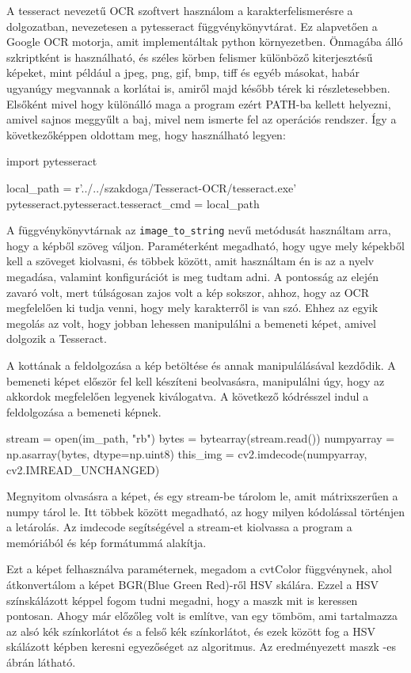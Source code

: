 A tesseract nevezetű OCR szoftvert használom a karakterfelismerésre a dolgozatban, nevezetesen a pytesseract függvénykönyvtárat. Ez alapvetően a Google OCR motorja, amit implementáltak python környezetben. Önmagába álló szkriptként is használható, és széles körben felismer különböző kiterjesztésű képeket, mint például a jpeg, png, gif, bmp, tiff és egyéb másokat, habár ugyanúgy megvannak a korlátai is, amiről majd később térek ki részletesebben. Elsőként mivel hogy különálló maga a program ezért PATH-ba kellett helyezni, amivel sajnos meggyűlt a baj, mivel nem ismerte fel az operációs rendszer. Így a következőképpen oldottam meg, hogy használható legyen:
\begin{python}
import pytesseract

local_path = r'../../szakdoga/Tesseract-OCR/tesseract.exe'
pytesseract.pytesseract.tesseract_cmd = local_path
\end{python}
A függvénykönyvtárnak az \texttt{image\_to\_string} nevű metódusát használtam arra, hogy a képből szöveg váljon. Paraméterként megadható, hogy ugye mely képekből kell a szöveget kiolvasni, és többek között, amit használtam én is az a nyelv megadása, valamint konfigurációt is meg tudtam adni. A pontosság az elején zavaró volt, mert túlságosan zajos volt a kép sokszor, ahhoz, hogy az OCR megfelelően ki tudja venni, hogy mely karakterről is van szó. Ehhez az egyik megolás az volt, hogy jobban lehessen manipulálni a bemeneti képet, amivel dolgozik a Tesseract.


A kottának a feldolgozása a kép betöltése és annak manipulálásával kezdődik. A bemeneti képet először fel kell készíteni beolvasásra, manipulálni úgy, hogy az akkordok megfelelően legyenek kiválogatva. A következő kódrésszel indul a feldolgozása a bemeneti képnek.

\begin{python}
stream = open(im_path, "rb")
bytes = bytearray(stream.read())
numpyarray = np.asarray(bytes, dtype=np.uint8)
this_img = cv2.imdecode(numpyarray, cv2.IMREAD_UNCHANGED)
\end{python}
Megnyitom olvasásra a képet, és egy stream-be tárolom le, amit mátrixszerűen a numpy tárol le. Itt többek között megadható, az hogy milyen kódolással történjen a letárolás. Az imdecode segítségével a stream-et kiolvassa a program a memóriából és kép formátummá alakítja.

Ezt a képet felhasználva paraméternek, megadom a cvtColor függvénynek, ahol átkonvertálom a képet BGR(Blue Green Red)-ről HSV skálára. Ezzel a HSV színskálázott képpel fogom tudni megadni, hogy a maszk mit is keressen pontosan. Ahogy már előzőleg volt is említve, van egy tömböm, ami tartalmazza az alsó kék színkorlátot és a felső kék színkorlátot, és ezek között fog a HSV skálázott képben keresni egyezőséget az algoritmus. Az eredményezett maszk -es ábrán látható. 

